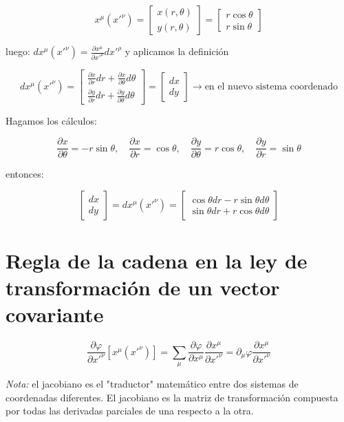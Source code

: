 \documentclass[a4paper]{article}
\begin{document}
$$x^{\mu}(x'^{\nu}) = \begin{bmatrix} x(r, \theta) \\ y(r,\theta) \end{bmatrix} = \begin{bmatrix} r\cos\theta \\ r\sin\theta \end{bmatrix}$$

luego: $dx^{\mu}(x'^{\nu}) = \frac{\partial x^{\mu}}{\partial x'^{\rho}}dx'^{\rho}$ y aplicamos la definición

$$dx^{\mu}(x'^{\nu}) = \begin{bmatrix} \frac{\partial x}{\partial r}dr + \frac{\partial x}{\partial \theta}d\theta \\ \frac{\partial y}{\partial r}dr + \frac{\partial y}{\partial \theta}d\theta \end{bmatrix} = \begin{bmatrix} dx \\ dy \end{bmatrix}\longrightarrow \text{en el nuevo sistema coordenado}$$

Hagamos los cálculos:

$$\frac{\partial x}{\partial \theta} = -r\sin\theta,\quad \frac{\partial x}{\partial r} = \cos\theta,\quad \frac{\partial y}{\partial \theta} = r\cos\theta,\quad \frac{\partial y}{\partial r} = \sin\theta$$

entonces:

$$\begin{bmatrix} dx \\ dy \end{bmatrix} = dx^{\mu}(x'^{\nu}) = \begin{bmatrix} \cos \theta dr - r\sin\theta d \theta \\ \sin \theta dr + r\cos\theta d \theta \end{bmatrix}$$

\section{Regla de la cadena en la ley de transformación de un vector covariante}

$$\frac{\partial \varphi}{\partial x'^{\nu}}\left[x^{\mu}(x'^{\nu})\right] = \sum_\mu \frac{\partial \varphi}{\partial x^{\mu}} \frac{\partial x^{\mu}}{\partial x'^{\nu}} = \partial_\mu \varphi \frac{\partial x^{\mu}}{\partial x'^{\nu}}$$

\textit{Nota:} el jacobiano es el "traductor" matemático entre dos sistemas de coordenadas diferentes. El jacobiano es la matriz de transformación compuesta por todas las derivadas parciales de una respecto a la otra.
\end{document}
